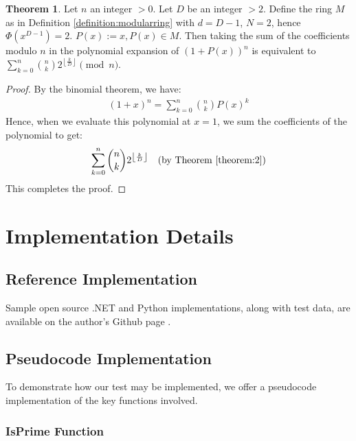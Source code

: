 \documentclass{article}
\theoremstyle{plain}
\theoremstyle{definition}
\newtheorem{theorem}{Theorem}
\newcommand{\redu}{\Phi}
\begin{document}
\begin{theorem} \label{theorem:3}
Let $n$ an integer $>0$. Let $D$ be an integer $>2$. Define the ring $M$ as in Definition \ref{definition:modularring} with $d=D-1$, $N=2$, hence $\redu(x^{D-1}) = 2$. $P(x) := x, P(x) \in M$. Then taking the sum of the coefficients modulo $n$ in the polynomial expansion of \( (1 + P(x))^n \) is equivalent to $\sum_{k=0}^{n} \binom{n}{k} 2^{\left\lfloor \frac{k}{D} \right\rfloor} \pmod{n}$.
\end{theorem}
\begin{proof}
By the binomial theorem, we have:
\begin{align}
    (1 + x)^n = \sum_{k=0}^{n} \binom{n}{k} P(x)^{k}
\end{align}
Hence, when we evaluate this polynomial at \( x = 1 \), we sum the coefficients of the polynomial to get:
\begin{align}
    \sum_{k=0}^{n} \binom{n}{k} 2^{\left\lfloor \frac{k}{D} \right\rfloor} \quad \text{(by Theorem \ref{theorem:2})}
\end{align}
This completes the proof.
\end{proof}

\section{Implementation Details}
\subsection{Reference Implementation}
Sample open source .NET and Python implementations, along with test data, are available on the author's Github page \cite{githubrepo}.

 \subsection{Pseudocode Implementation}
To demonstrate how our test may be implemented, we offer a pseudocode implementation of the key functions involved.

\subsubsection{IsPrime Function}
\end{document}
